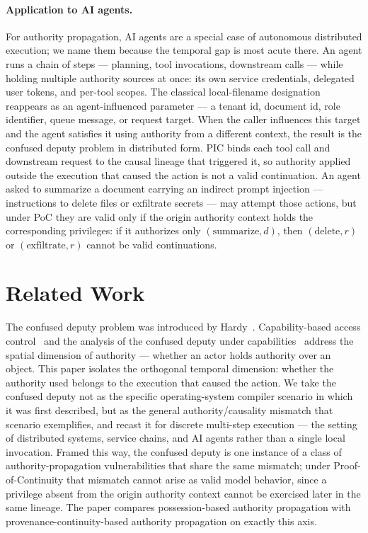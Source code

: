 \documentclass[11pt]{article}
\begin{document}
\paragraph{Application to AI agents.}
For authority propagation, AI agents are a special case of autonomous distributed
execution; we name them because the temporal gap is most acute there. An agent
runs a chain of steps --- planning, tool invocations, downstream calls --- while
holding multiple authority sources at once: its own service credentials, delegated
user tokens, and per-tool scopes. The classical local-filename designation
reappears as an agent-influenced parameter --- a tenant id, document id, role identifier,
queue message, or request target. When the caller influences this target and the
agent satisfies it using authority from a different context, the result is the
confused deputy problem in distributed form. PIC binds each tool call and downstream request to
the causal lineage that triggered it, so authority applied outside the execution
that caused the action is not a valid continuation. An agent asked to summarize a document
carrying an indirect prompt injection --- instructions to delete files or
exfiltrate secrets --- may attempt those actions, but under PoC they are valid
only if the origin authority context holds the corresponding privileges: if it
authorizes only $(\text{summarize},d)$, then $(\text{delete},r)$ or
$(\text{exfiltrate},r)$ cannot be valid continuations.

\section*{Related Work}

The confused deputy problem was introduced by Hardy~\cite{hardy1988confused}.
Capability-based access control~\cite{dennis1966programming} and the analysis of
the confused deputy under capabilities~\cite{miller2003capability} address the spatial
dimension of authority --- whether an actor holds authority over an object. This
paper isolates the orthogonal temporal dimension: whether the authority used
belongs to the execution that caused the action. We take the confused deputy not
as the specific operating-system compiler scenario in which it was first
described, but as the general authority/causality mismatch that scenario
exemplifies, and recast it for discrete multi-step execution --- the setting of
distributed systems, service chains, and AI agents rather than a single local
invocation. Framed this way, the confused deputy is one instance of a class of
authority-propagation vulnerabilities that share the same mismatch; under
Proof-of-Continuity that mismatch cannot arise as valid model behavior, since a
privilege absent from the origin authority context cannot be exercised later in
the same lineage. The paper compares possession-based authority propagation with
provenance-continuity-based authority propagation on exactly this axis.
\end{document}
